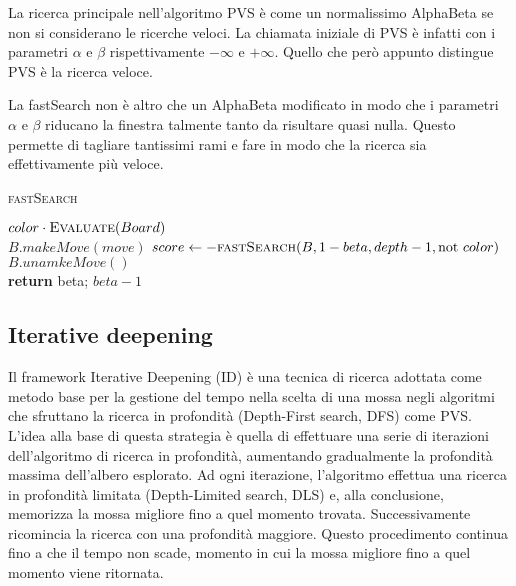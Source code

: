\documentclass[a4paper]{article}
\begin{document}
La ricerca principale nell'algoritmo PVS è come un normalissimo AlphaBeta se non
si considerano le ricerche veloci. La chiamata iniziale di PVS è infatti con i
parametri $\alpha$ e $\beta$ rispettivamente $-\infty$ e $+\infty$. Quello che 
però appunto distingue PVS è la ricerca veloce.

La fastSearch non è altro che un AlphaBeta modificato in modo che i parametri 
$\alpha$ e $\beta$ riducano la finestra talmente tanto da risultare quasi nulla.
Questo permette di tagliare tantissimi rami e fare in modo che la ricerca sia
effettivamente più veloce.

\begin{algorithm}
  \caption{\textsc{fastSearch}}
  \label{alg_fastSeach}
  \begin{algorithmic}

        \State \Return $color \cdot \Call{Evaluate}{Board}$
      \EndIf
      \\
        \State $B.makeMove(move)$
        \State $score \gets -\Call{fastSearch}{B, 1 - beta, depth - 1, \textrm{not } color}$
        \State $B.unamkeMove()$
        \\
        \State \textbf{return} beta;
        \EndIf
      \EndFor
      \State \Return $beta - 1$
    \EndFunction
  \end{algorithmic}
\end{algorithm}

\subsection{Iterative deepening}
Il framework Iterative Deepening (ID) è una tecnica di ricerca adottata come 
metodo base per la gestione del tempo nella scelta di una mossa negli algoritmi 
che sfruttano la ricerca in profondità (Depth-First search, DFS) come PVS. 
L'idea alla base di questa strategia è quella di effettuare una serie 
di iterazioni dell'algoritmo di ricerca in profondità, aumentando gradualmente 
la profondità massima dell'albero esplorato. Ad ogni iterazione, l'algoritmo 
effettua una ricerca in profondità limitata (Depth-Limited search, DLS) e, alla
conclusione, memorizza la mossa migliore fino a quel momento trovata. 
Successivamente ricomincia la ricerca con una profondità maggiore. Questo 
procedimento continua fino a che il tempo non scade, momento in cui la mossa 
migliore fino a quel momento viene ritornata.
\end{document}
